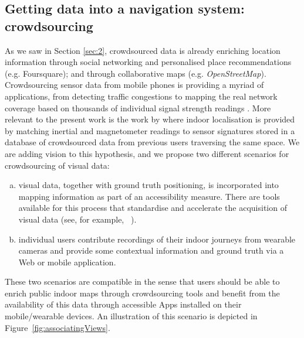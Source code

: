 \subsection{Getting data into a navigation system: crowdsourcing}
As we saw in Section \ref{sec:2}, crowdsourced data is already enriching location information through social networking and personalised place recommendations (e.g. Foursquare); and through collaborative maps (e.g. {\it OpenStreetMap}). Crowdsourcing sensor data from mobile phones is providing a myriad of applications, from detecting traffic congestions \citep{barth2009bright} to mapping the real network coverage based on thousands of individual signal strength readings \citep{ltereport2013android}. More relevant to the present work is the work by \citet{wang2012no} where indoor localisation is provided by matching inertial and magnetometer readings to sensor signatures stored in a database of crowdsourced data from previous users traversing the same space. We are adding vision to this hypothesis, and we propose two different scenarios for crowdsourcing of visual data:
\begin{enumerate}[a)] 
\item visual data, together with ground truth positioning, is incorporated into mapping information as part of an accessibility measure. There are tools available for this process that standardise and accelerate the acquisition of visual data (see, for example, ~\citep{navvisTrolley}).
\item individual users contribute recordings of their indoor journeys from wearable cameras and provide some contextual information and ground truth via a Web or mobile application. 
\end{enumerate}

These two scenarios are compatible in the sense that users should be able to enrich public indoor maps through crowdsourcing tools and benefit from the availability of this data through accessible Apps installed on their mobile/wearable devices. An illustration of this scenario is depicted in Figure~\ref{fig:associatingViews}.

